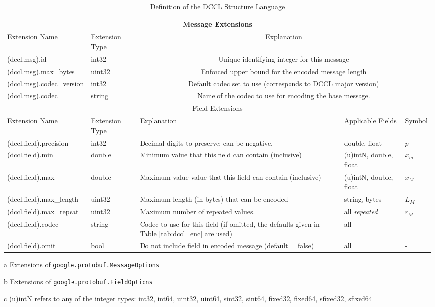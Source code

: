 \documentclass{article}
\begin{document}
\begin{table}
\centering
\begin{threeparttable}
\caption{Definition of the DCCL Structure Language}
\label{tab:dccl_language}
\begin{tabular}{l|p{}|p{}|p{}|l}
\hline \multicolumn{5}{c}{Message Extensions\tnote{a}} \\ \hline
\hline Extension Name & Extension Type & \multicolumn{3}{c}{Explanation} \\
\hline (dccl.msg).id & int32 & \multicolumn{3}{c}{Unique identifying integer for this message}  \\
\hline (dccl.msg).max\_bytes & uint32 & \multicolumn{3}{c}{Enforced upper bound for the encoded message length}  \\
\hline (dccl.msg).codec\_version & int32 & \multicolumn{3}{c}{Default codec set to use (corresponds to DCCL major version)}  \\
\hline (dccl.msg).codec & string & \multicolumn{3}{c}{Name of the codec to use for encoding the base message.}  \\
\hline \multicolumn{5}{c}{Field Extensions\tnote{b}} \\ \hline
\hline Extension Name & Extension Type & Explanation & Applicable Fields & Symbol \\
\hline (dccl.field).precision & int32 & Decimal digits to preserve; can be negative.  & double, float & $p$ \\
\hline (dccl.field).min  & double & Minimum value that this field can contain (inclusive) & (u)intN\tnote{c}, double, float  & $x_m$ \\
\hline (dccl.field).max  & double & Maximum value value that this field can contain (inclusive)   & (u)intN, double, float & $x_M$ \\
\hline (dccl.field).max\_length  & uint32  & Maximum length (in bytes) that can be encoded & string, bytes & $L_M$ \\
\hline (dccl.field).max\_repeat  & uint32  & Maximum number of repeated values. & all \textit{repeated} & $r_M$ \\
\hline (dccl.field).codec & string  & Codec to use for this field (if omitted, the defaults given in Table \ref{tab:dccl_enc} are used) & all & - \\
\hline (dccl.field).omit & bool & Do not include field in encoded message (default = false)  & all & - \\
\hline 
\end{tabular} 
\begin{tablenotes}
\item[a] Extensions of \texttt{google.protobuf.MessageOptions}
\item[b] Extensions of \texttt{google.protobuf.FieldOptions}
\item[c] (u)intN refers to any of the integer types: int32, int64, uint32, uint64, sint32, sint64, fixed32, fixed64, sfixed32, sfixed64
\end{tablenotes}
\end{threeparttable}
\end{table}
\end{document}
